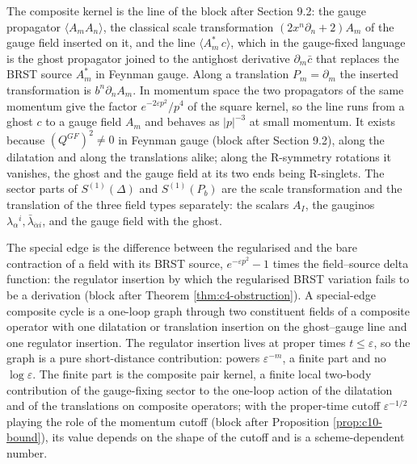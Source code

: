 \begin{remark}
The composite kernel is the line of the block after Section 9.2: the gauge propagator $\langle A_mA_n\rangle$, the classical scale transformation $(2x^n\partial_n+2)A_m$ of the gauge field inserted on it, and the line $\langle A^*_m\,c\rangle$, which in the gauge-fixed language is the ghost propagator joined to the antighost derivative $\partial_m\bar c$ that replaces the BRST source $A^*_m$ in Feynman gauge. Along a translation $P_m=\partial_m$ the inserted transformation is $b^n\partial_nA_m$. In momentum space the two propagators of the same momentum give the factor $e^{-2\varepsilon p^2}/p^4$ of the square kernel, so the line runs from a ghost $c$ to a gauge field $A_m$ and behaves as $|p|^{-3}$ at small momentum. It exists because $(Q^{GF})^2\neq0$ in Feynman gauge (block after Section 9.2), along the dilatation and along the translations alike; along the R-symmetry rotations it vanishes, the ghost and the gauge field at its two ends being R-singlets. The sector parts of $S^{(1)}(\Delta)$ and $S^{(1)}(P_b)$ are the scale transformation and the translation of the three field types separately: the scalars $A_I$, the gauginos $\lambda_\alpha{}^i,\bar\lambda_{\dot\alpha i}$, and the gauge field with the ghost.
\end{remark}

\begin{remark}
The special edge is the difference between the regularised and the bare contraction of a field with its BRST source, $e^{-\varepsilon p^2}-1$ times the field--source delta function: the regulator insertion by which the regularised BRST variation fails to be a derivation (block after Theorem \ref{thm:c4-obstruction}). A special-edge composite cycle is a one-loop graph through two constituent fields of a composite operator with one dilatation or translation insertion on the ghost--gauge line and one regulator insertion. The regulator insertion lives at proper times $t\le\varepsilon$, so the graph is a pure short-distance contribution: powers $\varepsilon^{-m}$, a finite part and no $\log\varepsilon$. The finite part is the composite pair kernel, a finite local two-body contribution of the gauge-fixing sector to the one-loop action of the dilatation and of the translations on composite operators; with the proper-time cutoff $\varepsilon^{-1/2}$ playing the role of the momentum cutoff (block after Proposition \ref{prop:c10-bound}), its value depends on the shape of the cutoff and is a scheme-dependent number.
\end{remark}

